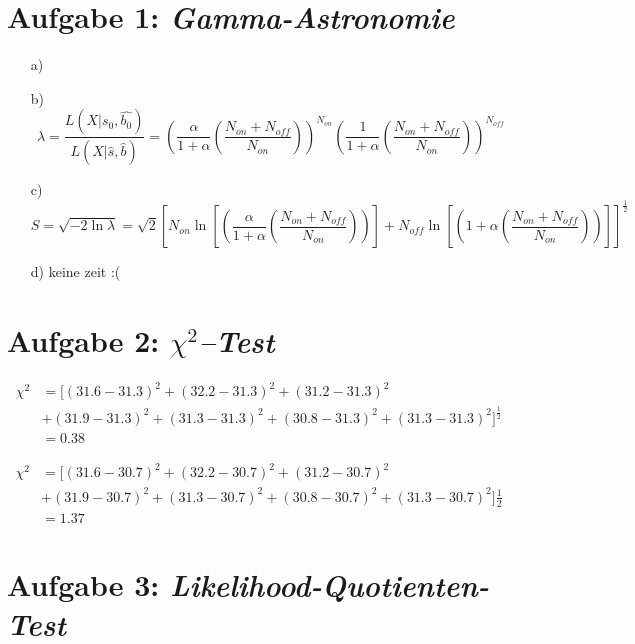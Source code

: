 
\section*{Aufgabe 1: \emph{Gamma-Astronomie}}
\begin{itemize}
\item[a)]
\item[b)] 
\begin{equation}
\lambda = \frac{L(X|s_0 , \hat{b_0})}{L(X|\hat{s},\hat{b})} = \left( \frac{\alpha}{1+\alpha} \left( \frac{N_{on}+N_{off}}{N_{on}} \right) \right)^{N_{on}} \left( \frac{1}{1+\alpha} \left( \frac{N_{on}+N_{off}}{N_{on}} \right) \right)^{N_{off}}
\end{equation}
\item[c)]
\begin{equation}
S=\sqrt{-2\ln\lambda} = \sqrt{2}\left[ N_{on} \ln\left[\left( \frac{\alpha}{1+\alpha} \left( \frac{N_{on}+N_{off}}{N_{on}} \right) \right)\right] +  N_{off} \ln\left[\left( 1+\alpha \left( \frac{N_{on}+N_{off}}{N_{on}} \right) \right)\right] \right]^{\frac{1}{2}}
\end{equation}
\item[d)] keine zeit :(
\end{itemize}

\section*{Aufgabe 2: \emph{$\chi^2$--Test}}

\begin{align*}
\chi^2 &= [(31.6-31.3)^2+(32.2-31.3)^2+(31.2-31.3)^2\\
&+(31.9-31.3)^2+(31.3-31.3)^2+(30.8-31.3)^2+(31.3-31.3)^2 ]^\frac{1}{2}\\
&= 0.38
\end{align*}

\begin{align*}
\chi^2 &= [(31.6-30.7)^2+(32.2-30.7)^2+(31.2-30.7)^2\\
&+(31.9-30.7)^2+(31.3-30.7)^2+(30.8-30.7)^2+(31.3-30.7)^2]\frac{1}{2}\\ 
&= 1.37
\end{align*}

\section*{Aufgabe 3: \emph{Likelihood-Quotienten-Test}}

